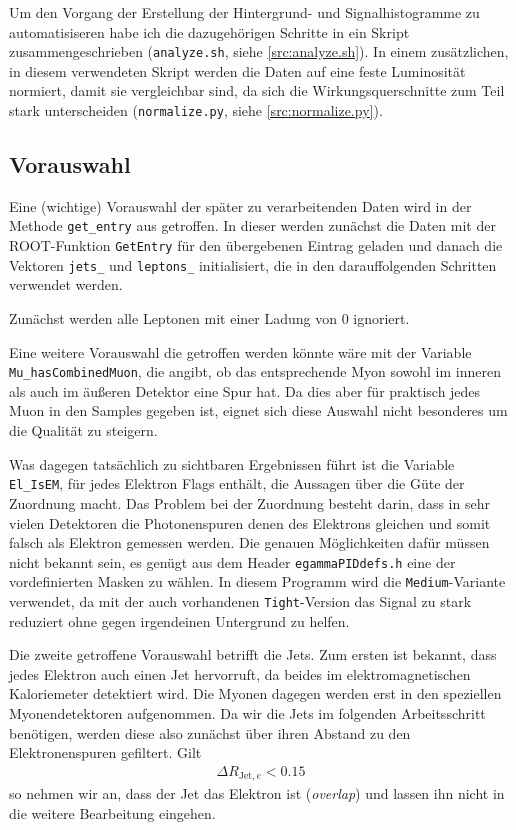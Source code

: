 Um den Vorgang der Erstellung der Hintergrund- und Signalhistogramme zu
automatisiseren habe ich die dazugehörigen Schritte in ein Skript
zusammengeschrieben (\verb'analyze.sh', siehe \ref{src:analyze.sh}). In einem
zusätzlichen, in diesem verwendeten Skript werden die Daten auf eine feste
Luminosität normiert, damit sie vergleichbar sind, da sich die
Wirkungsquerschnitte zum Teil stark unterscheiden (\verb'normalize.py', siehe
\ref{src:normalize.py}).

\subsection{Vorauswahl}
Eine (wichtige) Vorauswahl der später zu verarbeitenden Daten wird in der
Methode \lstinline'get_entry' aus  getroffen. In dieser werden
zunächst die Daten mit der ROOT-Funktion \lstinline'GetEntry' für den
übergebenen Eintrag geladen und danach die Vektoren \lstinline'jets_' und
\lstinline'leptons_' initialisiert, die in den darauffolgenden Schritten
verwendet werden.

Zunächst werden alle Leptonen mit einer Ladung von $0$ ignoriert.

Eine weitere Vorauswahl die getroffen werden könnte wäre mit der Variable
\lstinline'Mu_hasCombinedMuon', die angibt, ob das entsprechende Myon sowohl im
inneren als auch im äußeren Detektor eine Spur hat. Da dies aber für praktisch
jedes Muon in den Samples gegeben ist, eignet sich diese Auswahl nicht
besonderes um die Qualität zu steigern.

Was dagegen tatsächlich zu sichtbaren Ergebnissen führt ist die Variable
\lstinline'El_IsEM', für jedes Elektron Flags enthält, die Aussagen über die
Güte der Zuordnung macht. Das Problem bei der Zuordnung besteht darin, dass in
sehr vielen Detektoren die Photonenspuren denen des Elektrons gleichen und somit
falsch als Elektron gemessen werden. Die genauen Möglichkeiten dafür müssen
nicht bekannt sein, es genügt aus dem Header \texttt{egammaPIDdefs.h} eine der
vordefinierten Masken zu wählen. In diesem Programm wird die
\lstinline'Medium'-Variante verwendet, da mit der auch vorhandenen
\lstinline'Tight'-Version das Signal zu stark reduziert ohne gegen irgendeinen
Untergrund zu helfen.


Die zweite getroffene Vorauswahl betrifft die Jets. Zum ersten ist bekannt, dass
jedes Elektron auch einen Jet hervorruft, da beides im elektromagnetischen
Kaloriemeter detektiert wird. Die Myonen dagegen werden erst in den speziellen
Myonendetektoren aufgenommen. Da wir die Jets im folgenden Arbeitsschritt
benötigen, werden diese also zunächst über ihren Abstand zu den Elektronenspuren
gefiltert. Gilt
\begin{align}
  \Delta R_{\text{Jet},e} < 0.15
\end{align}
so nehmen wir an, dass der Jet das Elektron ist (\emph{overlap}) und lassen ihn
nicht in die weitere Bearbeitung eingehen.

